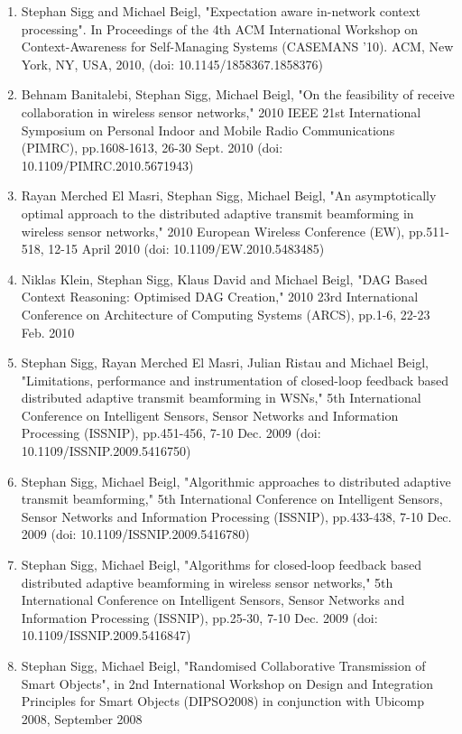 \documentclass[12pt]{article}
\begin{document}
\begin{enumerate}
\item Stephan Sigg and Michael Beigl, "Expectation aware in-network context processing". In Proceedings of the 4th ACM International Workshop on Context-Awareness for Self-Managing Systems (CASEMANS '10). ACM, New York, NY, USA, 2010, (doi: 10.1145/1858367.1858376)
\item Behnam Banitalebi, Stephan Sigg, Michael Beigl, "On the feasibility of receive collaboration in wireless sensor networks," 2010 IEEE 21st International Symposium on Personal Indoor and Mobile Radio Communications (PIMRC), pp.1608-1613, 26-30 Sept. 2010 (doi: 10.1109/PIMRC.2010.5671943)
\item Rayan Merched El Masri, Stephan Sigg, Michael Beigl, "An asymptotically optimal approach to the distributed adaptive transmit beamforming in wireless sensor networks," 2010 European Wireless Conference (EW), pp.511-518, 12-15 April 2010 (doi: 10.1109/EW.2010.5483485)
\item Niklas Klein, Stephan Sigg, Klaus David and Michael Beigl, "DAG Based Context Reasoning: Optimised DAG Creation," 2010 23rd International Conference on Architecture of Computing Systems (ARCS), pp.1-6, 22-23 Feb. 2010
\item Stephan Sigg, Rayan Merched El Masri, Julian Ristau and Michael Beigl, "Limitations, performance and instrumentation of closed-loop feedback based distributed adaptive transmit beamforming in WSNs," 5th International Conference on Intelligent Sensors, Sensor Networks and Information Processing (ISSNIP), pp.451-456, 7-10 Dec. 2009 (doi: 10.1109/ISSNIP.2009.5416750)
\item Stephan Sigg, Michael Beigl, "Algorithmic approaches to distributed adaptive transmit beamforming," 5th International Conference on Intelligent Sensors, Sensor Networks and Information Processing (ISSNIP), pp.433-438, 7-10 Dec. 2009 (doi: 10.1109/ISSNIP.2009.5416780)
\item Stephan Sigg, Michael Beigl, "Algorithms for closed-loop feedback based distributed adaptive beamforming in wireless sensor networks," 5th International Conference on Intelligent Sensors, Sensor Networks and Information Processing (ISSNIP), pp.25-30, 7-10 Dec. 2009 (doi: 10.1109/ISSNIP.2009.5416847)
\item Stephan Sigg, Michael Beigl, "Randomised Collaborative Transmission of Smart Objects", in 2nd International Workshop on Design and Integration Principles for Smart Objects (DIPSO2008) in conjunction with Ubicomp 2008, September 2008

\end{enumerate}
\end{document}
